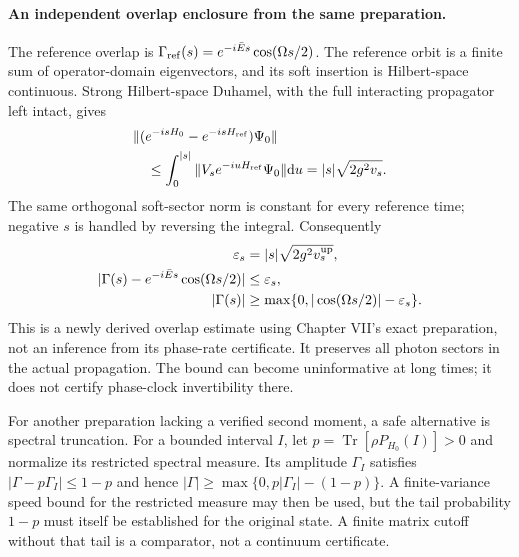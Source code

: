 \paragraph{An independent overlap enclosure from the same preparation.}
The reference overlap is
$\Gamma_{\rm ref}(s)=e^{-i\bar Es}\cos(\Omega s/2)$.
The reference orbit is a finite sum of operator-domain eigenvectors, and its soft insertion is Hilbert-space continuous. Strong Hilbert-space Duhamel, with the full interacting propagator left intact, gives
\begin{equation}
\begin{aligned}
 &\|(e^{-isH_0}-e^{-isH_{\rm ref}})\Psi_0\|\\
 &\quad\leq\int_0^{|s|}\|V_s e^{-iuH_{\rm ref}}\Psi_0\|\mathrm d u
 =|s|\sqrt{2g^2v_s}.
\end{aligned}
\end{equation}
The same orthogonal soft-sector norm is constant for every reference time;
negative $s$ is handled by reversing the integral. Consequently
\begin{equation}
\begin{aligned}
 \varepsilon_s&=|s|\sqrt{2g^2v_s^{\rm up}},\\
 |\Gamma(s)-e^{-i\bar Es}\cos(\Omega s/2)|&\leq\varepsilon_s,\\
 |\Gamma(s)|&\geq
 \max\{0,|\cos(\Omega s/2)|-\varepsilon_s\}.
\end{aligned}
 \label{eq:ch6-overlap-enclosure}
\end{equation}
This is a newly derived overlap estimate using Chapter VII's exact preparation,
not an inference from its phase-rate certificate. It preserves all photon
sectors in the actual propagation. The bound can become uninformative at
long times; it does not certify phase-clock invertibility there.

For another preparation lacking a verified second moment, a safe alternative
is spectral truncation. For a bounded interval $I$, let
$p=\operatorname{Tr}[\rho P_{H_0}(I)]>0$ and normalize its restricted spectral
measure. Its amplitude $\Gamma_I$ satisfies
$|\Gamma-p\Gamma_I|\leq1-p$ and hence
$|\Gamma|\geq\max\{0,p|\Gamma_I|-(1-p)\}$.
A finite-variance speed bound for the restricted measure may then be used,
but the tail probability $1-p$ must itself be established for the original
state. A finite matrix cutoff without that tail is a comparator, not a
continuum certificate.

